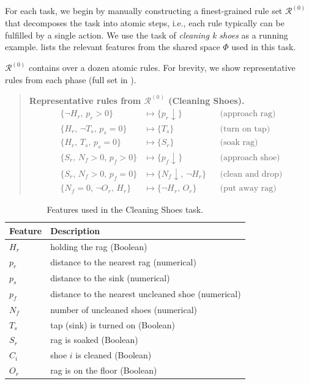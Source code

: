 \documentclass[11pt]{article}
\begin{document}
For each task, we begin by manually constructing a finest-grained rule set $\mathcal{R}^{(0)}$ that decomposes the task into atomic steps, i.e., each rule typically can be fulfilled by a single action. We use the task of \emph{cleaning k shoes} as a running example.  lists the relevant features from the shared space $\Phi$ used in this task.



$\mathcal{R}^{(0)}$ contains over a dozen atomic rules. For brevity, we show representative rules from each phase (full set in ).

\begin{quote}
\scriptsize
\textbf{Representative rules from $\mathcal{R}^{(0)}$ (Cleaning Shoes).}
\begin{align*}
\{\neg H_r,\, p_r > 0\} &\mapsto \{p_r \downarrow\} && \text{(approach rag)}\\
\{H_r,\, \neg T_s,\, p_s = 0\} &\mapsto \{T_s\} && \text{(turn on tap)}\\
\{H_r,\, T_s,\, p_s = 0\} &\mapsto \{S_r\} && \text{(soak rag)}\\
\{S_r,\, N_f > 0,\, p_f > 0\} &\mapsto \{p_f \downarrow\} && \text{(approach shoe)}\\
\{S_r,\, N_f > 0,\, p_f = 0\} &\mapsto \{N_f \downarrow,\, \neg H_r\} && \text{(clean and drop)}\\
\{N_f = 0,\, \neg O_r,\, H_r\} &\mapsto \{\neg H_r,\, O_r\} && \text{(put away rag)}
\end{align*}
\end{quote}

\begin{table}[t]
\centering
\scriptsize
\begin{tabular}{ll}
\toprule
\textbf{Feature} & \textbf{Description} \\
\midrule
$H_r$ & holding the rag (Boolean) \\
$p_r$ & distance to the nearest rag (numerical) \\
$p_s$ & distance to the sink (numerical) \\
$p_f$ & distance to the nearest uncleaned shoe (numerical) \\
$N_f$ & number of uncleaned shoes (numerical) \\
$T_s$ & tap (sink) is turned on (Boolean) \\
$S_r$ & rag is soaked (Boolean) \\
$C_i$ & shoe $i$ is cleaned (Boolean) \\
$O_r$ & rag is on the floor (Boolean) \\
\bottomrule
\end{tabular}
\caption{Features used in the Cleaning Shoes task.}
\label{tab:shoe_features}
\end{table}
\end{document}
